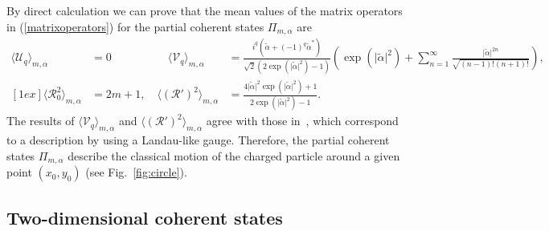 \documentclass[aps,showpacs,showkeys]{revtex4}
\begin{document}
By direct calculation we can prove that the mean values of the matrix operators in (\ref{matrixoperators}) for the partial coherent states $\Pi_{m,\alpha}$ are 
\begin{eqnarray}
	\langle\mathcal{U}_{q}\rangle_{m,\alpha}&=0 \qquad\qquad\quad \langle\mathcal{V}_{q}\rangle_{m,\alpha}&=\frac{i^{q}(\tilde{\alpha}+(-1)^{q}\tilde{\alpha}^{\ast})}{\sqrt{2}(2\exp\left(\vert\tilde{\alpha}\vert^2\right)-1)}\left(\exp\left(\vert\tilde{\alpha}\vert^{2}\right)+\sum_{n=1}^{\infty}\frac{\vert\tilde{\alpha}\vert^{2n}}{\sqrt{(n-1)!(n+1)!}}\right), \\ [1ex]
	\langle\mathcal{R}_{0}^{2}\rangle_{m,\alpha}&=2m+1, \quad \langle(\mathcal{R}')^{2}\rangle_{m,\alpha}&=\frac{4\vert\tilde{\alpha}\vert^{2}\exp\left(\vert\tilde{\alpha}\vert^{2}\right)+1}{2\exp\left(\vert\tilde{\alpha}\vert^2\right)-1}.
\end{eqnarray}
The results of $\langle\mathcal{V}_{q}\rangle_{m,\alpha}$ and $\langle(\mathcal{R}')^{2}\rangle_{m,\alpha}$ agree with those in~\cite{df17}, which correspond to a description by using a Landau-like gauge. Therefore, the partial coherent states $\Pi_{m,\alpha}$ describe the classical motion of the charged particle around a given point $(x_{0},y_{0})$ (see Fig.~\ref{fig:circle}).



\subsection{Two-dimensional coherent states}\label{sec3.3}
\end{document}
